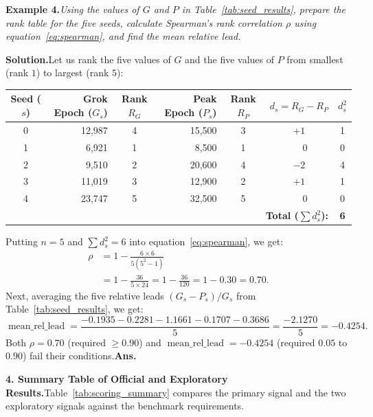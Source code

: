 \documentclass[11pt,a4paper,oneside]{report}
\newcommand{\Ans}{\hfill\textbf{Ans.}}
\begin{document}
\noindent\textbf{Example 4.}\quad \textit{Using the values of $G$ and $P$ in Table~\ref{tab:seed_results}, prepare the rank table for the five seeds, calculate Spearman's rank correlation $\rho$ using equation~\eqref{eq:spearman}, and find the mean relative lead.}

\smallskip
\noindent\textbf{Solution.}\quad Let us rank the five values of $G$ and the five values of $P$ from smallest (rank $1$) to largest (rank $5$):

\begin{center}
\begin{tabular}{c r c r c c c}
\toprule
\textbf{Seed ($s$)} & \textbf{Grok Epoch ($G_s$)} & \textbf{Rank $R_G$} & \textbf{Peak Epoch ($P_s$)} & \textbf{Rank $R_P$} & \textbf{$d_s = R_G - R_P$} & \textbf{$d_s^2$}\\
\midrule
0 & 12,987 & 4 & 15,500 & 3 & $+1$ & 1\\
1 & 6,921  & 1 & 8,500  & 1 & $\phantom{+}0$ & 0\\
2 & 9,510  & 2 & 20,600 & 4 & $-2$ & 4\\
3 & 11,019 & 3 & 12,900 & 2 & $+1$ & 1\\
4 & 23,747 & 5 & 32,500 & 5 & $\phantom{+}0$ & 0\\
\midrule
\multicolumn{6}{r}{\textbf{Total ($\sum d_s^2$):}} & \textbf{6}\\
\bottomrule
\end{tabular}
\end{center}

\noindent Putting $n = 5$ and $\sum d_s^2 = 6$ into equation~\eqref{eq:spearman}, we get:
\begin{align*}
\rho &= 1 - \frac{6 \times 6}{5(5^2 - 1)}\\
     &= 1 - \frac{36}{5 \times 24} = 1 - \frac{36}{120} = 1 - 0.30 = \mathbf{0.70}.
\end{align*}
Next, averaging the five relative leads $(G_s - P_s)/G_s$ from Table~\ref{tab:seed_results}, we get:
\[
\operatorname{mean\_rel\_lead} = \frac{-0.1935 - 0.2281 - 1.1661 - 0.1707 - 0.3686}{5} = \frac{-2.1270}{5} = \mathbf{-0.4254}.
\]
Both $\rho = 0.70$ (required $\ge 0.90$) and $\operatorname{mean\_rel\_lead} = -0.4254$ (required $0.05$ to $0.90$) fail their conditions.\Ans

\medskip
\noindent\textbf{4. Summary Table of Official and Exploratory Results.}\quad Table~\ref{tab:scoring_summary} compares the primary signal and the two exploratory signals against the benchmark requirements.
\end{document}
